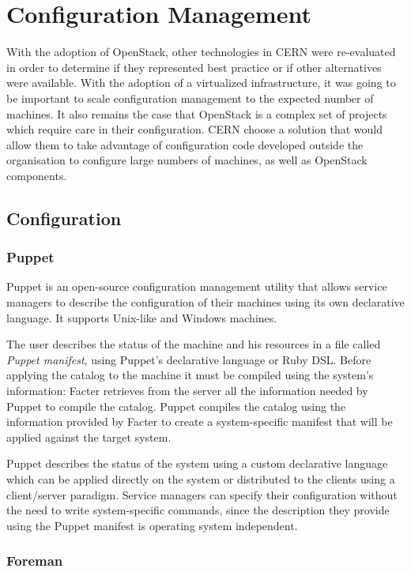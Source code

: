 \section{Configuration Management}

With the adoption of OpenStack, other technologies in CERN were 
re-evaluated in order to determine if they represented best practice or
if other alternatives were available. With the adoption of a virtualized
infrastructure, it was going to be important to scale configuration
management to the expected number of machines. It also remains the case
that OpenStack is a complex set of projects which require care in their
configuration. CERN choose a solution that would allow them to take
advantage of configuration code developed outside the organisation to
configure large numbers of machines, as well as OpenStack components.

\subsection{Configuration}

\subsubsection{Puppet}

Puppet is an open-source configuration management utility that allows
service managers to describe the configuration of their machines using its
own declarative language. It supports Unix-like and Windows machines.

The user describes the status of the machine and his resources in a file
called \textit{Puppet manifest}, using Puppet's declarative language or
Ruby DSL. Before applying the catalog to the machine it must be compiled
using the system's information: Facter retrieves from the server all the
information needed by Puppet to compile the catalog. Puppet compiles the
catalog using the information provided by Facter to create
a system-specific manifest that will be applied against the target system.

Puppet describes the status of the system using a custom declarative
language which can be applied directly on the system or distributed to the
clients using a client/server paradigm. Service managers can specify their
configuration without the need to write system-specific commands, since
the description they provide using the Puppet manifest is operating system
independent.

\subsubsection{Foreman}

